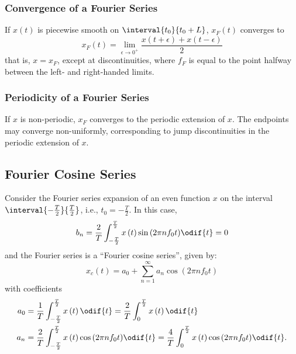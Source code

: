 \documentclass{article}
\begin{document}
\subsubsection{Convergence of a Fourier Series}
If \(x\left( t \right)\) is piecewise smooth on \(\interval{t_0}{t_0 +
L}\), \(x_F\left( t \right)\) converges to
\begin{equation*}
    x_F\left( t \right) = \lim_{\epsilon \to 0^{+}} \frac{x\left( t + \epsilon \right) + x\left( t - \epsilon \right)}{2}
\end{equation*}
that is, \(x = x_F\), except at discontinuities, where \(f_F\) is equal to the point halfway between the left- and right-handed limits.
\subsubsection{Periodicity of a Fourier Series}
If \(x\) is non-periodic, \(x_F\) converges to the periodic extension
of \(x\). The endpoints may converge non-uniformly, corresponding to
jump discontinuities in the periodic extension of \(x\).
\subsection{Fourier Cosine Series}
Consider the Fourier series expansion of an even function \(x\) on the
interval \(\interval{-\frac{T}{2}}{\frac{T}{2}}\), i.e., \(t_0 =
-\frac{T}{2}\). In this case,
\begin{equation*}
    b_n = \frac{2}{T} \int_{-\frac{T}{2}}^{\frac{T}{2}} x\left( t \right) \sin{\left( 2\pi n f_0 t \right)} \odif{t} = 0
\end{equation*}
and the Fourier series is a ``Fourier cosine series'', given by:
\begin{equation*}
    x_c\left( t \right) = a_0 + \sum_{n = 1}^\infty a_n \cos{\left( 2\pi n f_0 t \right)}
\end{equation*}
with coefficients
\begin{align*}
    a_0 & = \frac{1}{T} \int_{-\frac{T}{2}}^{\frac{T}{2}} x\left( t \right) \odif{t}                                    = \frac{2}{T} \int_0^{\frac{T}{2}} x\left( t \right) \odif{t}                                    \\
    a_n & = \frac{2}{T} \int_{-\frac{T}{2}}^{\frac{T}{2}} x\left( t \right) \cos{\left( 2 \pi n f_0 t \right)} \odif{t} = \frac{4}{T} \int_0^{\frac{T}{2}} x\left( t \right) \cos{\left( 2\pi n f_0 t \right)} \odif{t}.
\end{align*}
\end{document}
